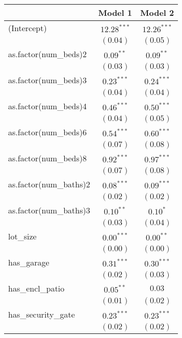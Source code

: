 
\begin{table}
\begin{center}
\begin{tabular}{l c c}
\hline
 & Model 1 & Model 2 \\
\hline
(Intercept)            & $12.28^{***}$ & $12.26^{***}$ \\
                       & $(0.04)$      & $(0.05)$      \\
as.factor(num\_beds)2  & $0.09^{**}$   & $0.09^{**}$   \\
                       & $(0.03)$      & $(0.03)$      \\
as.factor(num\_beds)3  & $0.23^{***}$  & $0.24^{***}$  \\
                       & $(0.04)$      & $(0.04)$      \\
as.factor(num\_beds)4  & $0.46^{***}$  & $0.50^{***}$  \\
                       & $(0.04)$      & $(0.05)$      \\
as.factor(num\_beds)6  & $0.54^{***}$  & $0.60^{***}$  \\
                       & $(0.07)$      & $(0.08)$      \\
as.factor(num\_beds)8  & $0.92^{***}$  & $0.97^{***}$  \\
                       & $(0.07)$      & $(0.08)$      \\
as.factor(num\_baths)2 & $0.08^{***}$  & $0.09^{***}$  \\
                       & $(0.02)$      & $(0.02)$      \\
as.factor(num\_baths)3 & $0.10^{**}$   & $0.10^{*}$    \\
                       & $(0.03)$      & $(0.04)$      \\
lot\_size              & $0.00^{***}$  & $0.00^{**}$   \\
                       & $(0.00)$      & $(0.00)$      \\
has\_garage            & $0.31^{***}$  & $0.30^{***}$  \\
                       & $(0.02)$      & $(0.03)$      \\
has\_encl\_patio       & $0.05^{**}$   & $0.03$        \\
                       & $(0.01)$      & $(0.02)$      \\
has\_security\_gate    & $0.23^{***}$  & $0.23^{***}$  \\
                       & $(0.02)$      & $(0.02)$      \\

\end{tabular}
\end{center}
\end{table}
